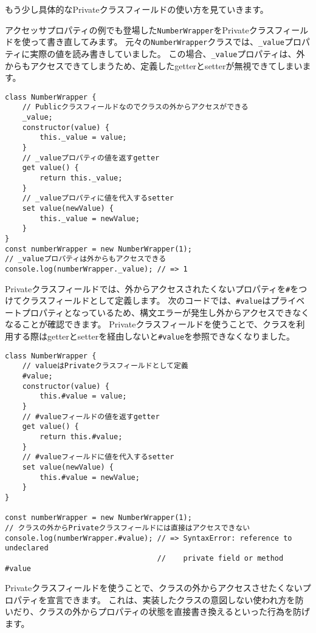 もう少し具体的なPrivateクラスフィールドの使い方を見ていきます。

アクセッサプロパティの例でも登場した\texttt{NumberWrapper}をPrivateクラスフィールドを使って書き直してみます。
元々の\texttt{NumberWrapper}クラスでは、\texttt{\_value}プロパティに実際の値を読み書きしていました。
この場合、\texttt{\_value}プロパティは、外からもアクセスできてしまうため、定義したgetterとsetterが無視できてしまいます。

\begin{lstlisting}
class NumberWrapper {
    // Publicクラスフィールドなのでクラスの外からアクセスができる
    _value;
    constructor(value) {
        this._value = value;
    }
    // _valueプロパティの値を返すgetter
    get value() {
        return this._value;
    }
    // _valueプロパティに値を代入するsetter
    set value(newValue) {
        this._value = newValue;
    }
}
const numberWrapper = new NumberWrapper(1);
// _valueプロパティは外からもアクセスできる
console.log(numberWrapper._value); // => 1
\end{lstlisting}

Privateクラスフィールドでは、外からアクセスされたくないプロパティを\texttt{\#}をつけてクラスフィールドとして定義します。
次のコードでは、\texttt{\#value}はプライベートプロパティとなっているため、構文エラーが発生し外からアクセスできなくなることが確認できます。
Privateクラスフィールドを使うことで、クラスを利用する際はgetterとsetterを経由しないと\texttt{\#value}を参照できなくなりました。

\begin{lstlisting}
class NumberWrapper {
    // valueはPrivateクラスフィールドとして定義
    #value;
    constructor(value) {
        this.#value = value;
    }
    // #valueフィールドの値を返すgetter
    get value() {
        return this.#value;
    }
    // #valueフィールドに値を代入するsetter
    set value(newValue) {
        this.#value = newValue;
    }
}

const numberWrapper = new NumberWrapper(1);
// クラスの外からPrivateクラスフィールドには直接はアクセスできない
console.log(numberWrapper.#value); // => SyntaxError: reference to undeclared 
                                   //    private field or method #value
\end{lstlisting}

Privateクラスフィールドを使うことで、クラスの外からアクセスさせたくないプロパティを宣言できます。
これは、実装したクラスの意図しない使われ方を防いだり、クラスの外からプロパティの状態を直接書き換えるといった行為を防げます。

